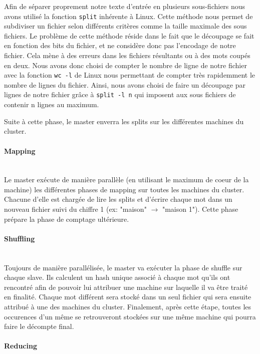\documentclass{article}
\begin{document}
Afin de séparer proprement notre texte d'entrée en plusieurs sous-fichiers nous avons utilisé la fonction \texttt{split} inhérente à Linux. Cette méthode nous permet
de subdiviser un fichier selon différents critères comme la taille maximale des sous fichiers. Le problème de cette méthode réside dans le fait que le découpage se fait 
en fonction des bits du fichier, et ne considère donc pas l'encodage de notre fichier. Cela mène à des erreurs dans les fichiers résultants ou à des mots coupés en deux. 
Nous avons donc choisi de compter le nombre de ligne de notre fichier avec la fonction \texttt{wc -l} de Linux nous permettant de compter très rapidemment le 
nombre de lignes du fichier. Ainsi, nous avons choisi de faire un découpage par lignes de notre fichier grâce à \texttt{split -l n} qui imposent aux sous fichiers de contenir n lignes au maximum.

Suite à cette phase, le master enverra les splits sur les différentes machines du cluster.
\paragraph{Mapping \\ \\}

Le master exécute de manière parallèle (en utilisant le maximum de coeur de la machine) les différentes phases de mapping sur toutes 
les machines du cluster. Chacune d'elle est chargée de lire les splits et d'écrire chaque mot dans un nouveau fichier suivi du chiffre 1 (ex: "maison" $\rightarrow$ "maison 1"). 
Cette phase prépare la phase de comptage ultérieure.

\paragraph{Shuffling \\ \\}

Toujours de manière parallélisée, le master va exécuter la phase de shuffle sur chaque slave. Ils calculent un hash unique associé à chaque mot qu'ils ont rencontré afin de pouvoir lui attribuer une machine sur laquelle il va être traité en finalité. Chaque mot différent sera stocké
dans un seul fichier qui sera ensuite attribué à une des machines du cluster. Finalement, après cette étape, toutes les occurences d'un même se retrouveront
stockées sur une même machine qui pourra faire le décompte final.

\paragraph{Reducing \\ \\}
\end{document}
